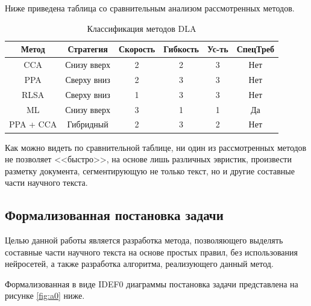 Ниже приведена таблица со сравнительным анализом рассмотренных методов.

\begin{table}[H]
    \centering
    \caption{Классификация методов DLA}
    \label{tab:table}
    \begin{tabular}{|c|c|c|c|c|c|}
        \hline
        \textbf{Метод} & \textbf{Стратегия} & \textbf{Скорость} & \textbf{Гибкость} & \textbf{Ус-ть} & \textbf{СпецТреб} \\ \hline
        CCA        & Снизу вверх & 2 & 2 & 3 & Нет \\ \hline
        PPA        & Сверху вниз & 2 & 3 & 3 & Нет \\ \hline
        RLSA       & Сверху вниз & 1 & 3 & 3 & Нет \\ \hline
        ML         & Снизу вверх & 3 & 1 & 1 & Да \\ \hline
        PPA + CCA  & Гибридный   & 2 & 3 & 2 & Нет \\ \hline
    \end{tabular}
\end{table}

Как можно видеть по сравнительной таблице, ни один из рассмотренных методов не позволяет <<быстро>>, на основе лишь различных эвристик, произвести разметку документа, сегментирующую не только текст, но и другие составные части научного текста.

\subsection{Формализованная постановка задачи}


Целью данной работы является разработка метода, позволяющего выделять составные части научного текста на основе простых правил, без использования нейросетей, а также разработка алгоритма, реализующего данный метод.

Формализованная в виде IDEF0 диаграммы постановка задачи представлена на рисунке \ref{fig:a0} ниже.

